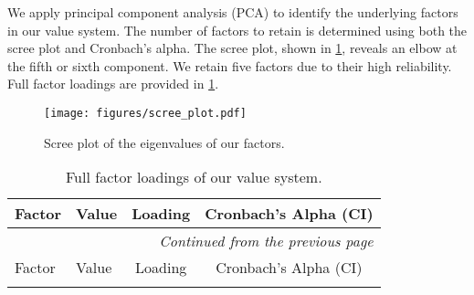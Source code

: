 We apply principal component analysis (PCA) to identify the underlying factors in our value system. The number of factors to retain is determined using both the scree plot and Cronbach's alpha. The scree plot, shown in \cref{fig:scree_plot}, reveals an elbow at the fifth or sixth component. We retain five factors due to their high reliability. Full factor loadings are provided in \cref{tab:full_factor_loadings}.



\begin{figure}[H]
    \centering
    \texttt{[image: figures/scree\_plot.pdf]}
    \caption{Scree plot of the eigenvalues of our factors.}
    \label{fig:scree_plot}
\end{figure}




\begin{longtable}{llcc}
    \caption{Full factor loadings of our value system.} \label{tab:full_factor_loadings}
    \\
    \toprule
    Factor & Value & Loading & Cronbach's Alpha (CI) \\
    \midrule
    \endfirsthead
    
    \multicolumn{4}{r}{\textit{Continued from the previous page}} \\
    \toprule
    Factor & Value & Loading & Cronbach's Alpha (CI) \\
    \midrule
    \endhead
    
    \bottomrule
    \endlastfoot


\end{longtable}
